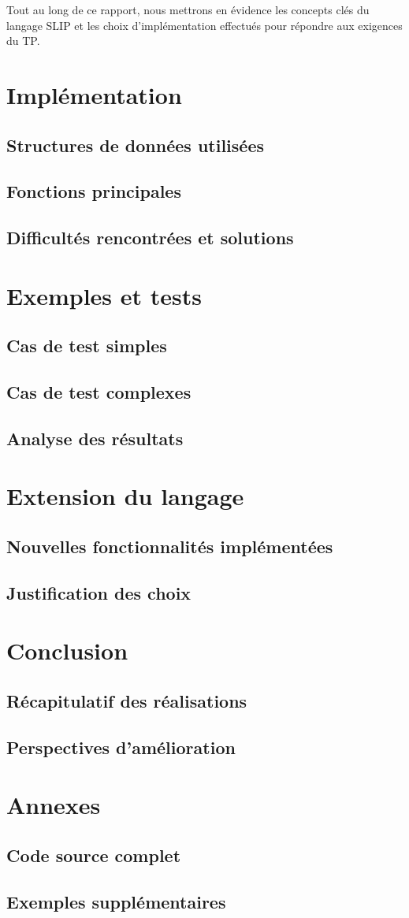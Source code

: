 \documentclass{article}
\begin{document}
    Tout au long de ce rapport, nous mettrons en évidence les concepts clés du langage SLIP et les choix d'implémentation
    effectués pour répondre aux exigences du TP.

\section{Implémentation}
\subsection{Structures de données utilisées}
\subsection{Fonctions principales}
\subsection{Difficultés rencontrées et solutions}

\section{Exemples et tests}
\subsection{Cas de test simples}
\subsection{Cas de test complexes}
\subsection{Analyse des résultats}

\section{Extension du langage}
\subsection{Nouvelles fonctionnalités implémentées}
\subsection{Justification des choix}

\section{Conclusion}
\subsection{Récapitulatif des réalisations}
\subsection{Perspectives d'amélioration}

\section{Annexes}
\subsection{Code source complet}
\subsection{Exemples supplémentaires}
\end{document}
